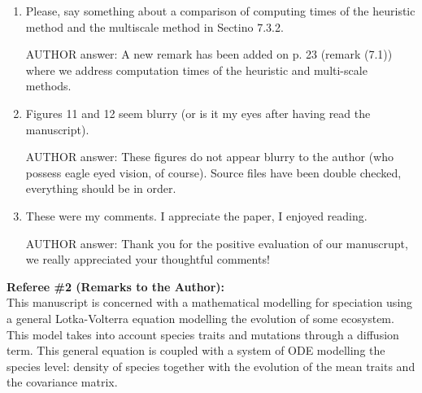 \documentclass[a4paper,11pt]{scrartcl}
\begin{document}
\begin{enumerate}
\item
Please, say something about a comparison of computing times of the heuristic method and the multiscale method in Sectino 7.3.2.

AUTHOR answer: A new remark has been added on p. 23 (remark (7.1)) where we address computation times of the heuristic and multi-scale methods.

\item
Figures 11 and 12 seem blurry (or is it my eyes after having read the manuscript).

AUTHOR answer: These figures do not appear blurry to the author (who possess eagle eyed vision, of course). Source files have been double checked, everything should be in order.

\item
These were my comments. I appreciate the paper, I enjoyed reading.

AUTHOR answer: Thank you for the positive evaluation of our manuscrupt, we really appreciated your thoughtful comments!
\end{enumerate}
\textbf{Referee \#2  (Remarks to the Author):}\\

This manuscript is concerned with a mathematical modelling for speciation using a general Lotka-Volterra equation modelling the evolution of some ecosystem. This model takes into account species traits and mutations through a diffusion term. This general equation is coupled with a system of ODE modelling the species level: density of species together with the evolution of the mean traits and the covariance matrix.
\end{document}

